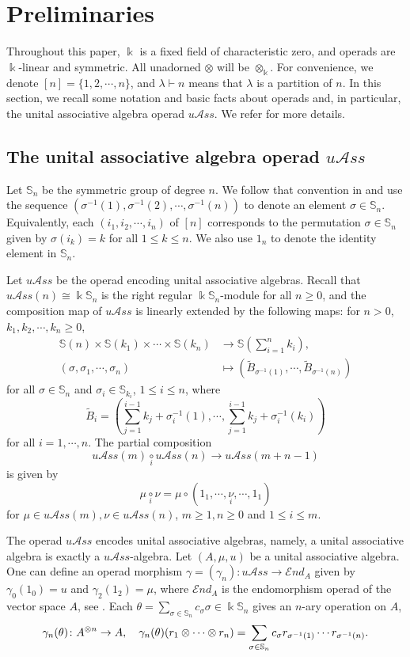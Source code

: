 \documentclass{amsart}
\theoremstyle{definition}
\theoremstyle{remark}
\numberwithin{equation}{section}
\def\S{\mathbb{S}}
\newcommand{\ucr}[1]{\underset{#1}{\circ}}
\def\la{\lambda}
\def \ot{\otimes}
\def \uas{u\mathcal{A}ss}
\def \k{\Bbbk}
\def \S{\mathbb{S}}
\begin{document}
\section{Preliminaries}
\label{yysec1}

Throughout this paper, $\k$ is a fixed field of characteristic 
zero, and operads are $\Bbbk$-linear and symmetric. All 
unadorned $\ot$ will be $\ot_\k$. For convenience, we denote 
$[n]=\{1, 2, \cdots, n\}$, and $\lambda\vdash n$ means that 
$\la$ is a partition of $n$. In this section, we recall some 
notation and basic facts about operads and, in particular, the 
unital associative algebra operad $\uas$. We refer \cite{BYZ} 
for more details. 

\subsection{The unital associative algebra operad $\uas$}
\label{yysec1.1}
Let $\S_n$ be the symmetric group of degree $n$. We follow 
that convention in \cite{BYZ} and use the sequence 
$(\sigma^{-1}(1), \sigma^{-1}(2), \cdots, \sigma^{-1}(n))$ 
to denote an element $\sigma\in \S_n$. Equivalently, each 
$(i_1, i_2, \cdots, i_n)$ of $[n]$ corresponds to the 
permutation $\sigma\in \S_n$ given by $\sigma(i_k)=k$ 
for all $1\le k\le n$. We also use $1_n$ to denote the 
identity element in $\S_n$.

Let $\uas$ be the operad encoding unital associative algebras.
Recall that $\uas(n)\cong \Bbbk\S_n$ is the right regular 
$\Bbbk\S_n$-module for all $n\geq 0$, and the composition map 
of $\uas$ is linearly extended by the following maps: for $n>0$, 
$k_1, k_2, \cdots, k_n\ge 0$,
\begin{align*}
\S(n) \times \S(k_1)\times \cdots \times \S(k_n)
   &\to \S(\sum_{i=1}^n k_i),\\
(\sigma, \sigma_1, \cdots, \sigma_n) 
  &\mapsto (\tilde{B}_{\sigma^{-1}(1)}, \cdots, 
	\tilde{B}_{\sigma^{-1}(n)})
\end{align*}
for all $\sigma\in \S_n$ and $\sigma_i\in \S_{k_i}$, 
$1\le i\le n$, where 
\[\tilde{B}_{i}=(\sum_{j=1}^{i-1}k_j+\sigma_i^{-1}(1), 
\cdots, \sum_{j=1}^{i-1}k_j+\sigma_i^{-1}(k_i))\]
for all $i=1, \cdots, n$. The partial composition 
\[\uas(m) \ucr{i} \uas(n)  \to \uas(m+n-1)\]
is given by 
\[\mu\ucr{i}  \nu=\mu\circ (1_1, \cdots, 
\underset{i}{\nu}, \cdots, 1_1)\]
for $\mu\in \uas(m), \nu\in \uas(n)$, $m\ge 1, n\ge 0$ 
and $1\le i\le m$.


The operad $\uas$ encodes unital associative algebras, namely, a unital associative algebra is exactly a $\uas$-algebra. 
Let $(A, \mu, u)$ be a unital associative algebra. One can define an operad morphism 
$\gamma=(\gamma_n)\colon \uas \to \mathcal{E}nd_A$
given by $\gamma_0(1_0)=u$ and $\gamma_2(1_2)=\mu$, 
where $\mathcal{E}nd_A$ is the endomorphism operad of the vector space $A$, see \cite[Section 5.2.11]{LV}.
Each $\theta=\sum_{\sigma\in \S_n} c_\sigma \sigma\in \Bbbk\S_n$ gives an $n$-ary operation on $A$, 
\begin{align}\notag
\gamma_n(\theta)\colon A^{\otimes n} \to A, \quad 
\gamma_n(\theta)(r_1\otimes\cdots\otimes r_n)
=\sum_{\sigma\in \S_n} c_\sigma r_{\sigma^{-1}(1)}
\cdots r_{\sigma^{-1}(n)}.
\end{align}
\end{document}
